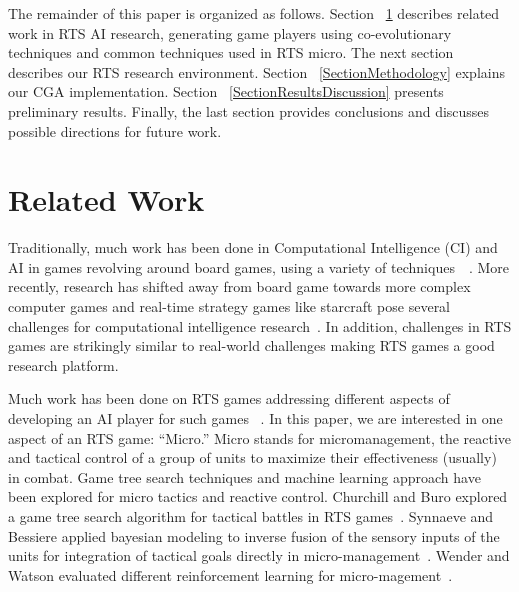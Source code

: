 \documentclass[conference,10pt]{IEEEtran}
\begin{document}


The remainder of this paper is organized as follows. Section
~\ref{SectionRelatedWork} describes related work in RTS AI research,
generating game players using co-evolutionary techniques and common
techniques used in RTS micro. The next section describes our RTS
research environment. Section ~\ref{SectionMethodology} explains our CGA
implementation. Section ~\ref{SectionResultsDiscussion} presents preliminary
results. Finally, the last section provides conclusions and discusses
possible directions for future work.
%
\section{Related Work}
\label{SectionRelatedWork}

Traditionally, much work has been done in Computational Intelligence
(CI) and AI in games revolving around board games, using a variety of
techniques~\cite{AMLIGAS01}~\cite{ACPAR11}. More recently, research
has shifted away from board game towards more complex computer games
and real-time strategy games like starcraft pose several challenges
for computational intelligence research~\cite{RSANARC03}. In addition, 
challenges in RTS games are strikingly similar to real-world
challenges making RTS games a good research platform.

Much work has been done on RTS games addressing different aspects of
developing an AI player for such games ~\cite{ASORSGARACIS13}. In this
paper, we are interested in one aspect of an RTS game: ``Micro.'' Micro
stands for micromanagement, the reactive and tactical control of a
group of units to maximize their effectiveness (usually) in combat.
Game tree search techniques and machine learning approach have been explored for
micro tactics and reactive control. Churchill and Buro explored a game tree
search algorithm for tactical battles in RTS
games~\cite{FHSFRTSGCSS12}. Synnaeve and Bessiere applied bayesian
modeling to inverse fusion of the sensory inputs of the units for
integration of tactical goals directly in
micro-management~\cite{ABMFRUCATS11}. Wender and Watson evaluated
different reinforcement learning for
micro-magement~\cite{ARLTSSCITRTSGSB12}.
\end{document}
